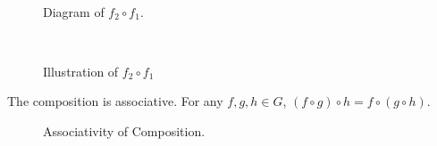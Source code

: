 \documentclass[11pt,openany]{article}
\begin{document}
\begin{note}[Diagram]
	\ \begin{figure}[h!]
		\centering
		
		\caption{Diagram of $f_2\circ f_1$.}
	\end{figure}
\end{note}
\newpage
\begin{note}[Illustration]
	\ \begin{figure}[h!]\centering
		\caption{Illustration of $f_2\circ f_1$}
	\end{figure}
\end{note}
\vfill
\begin{remark*}
	The composition is associative. For any \( f, g, h \in G \), $
	(f \circ g) \circ h = f \circ (g \circ h) $.
	\begin{figure}[h!]\centering
	\caption{Associativity of Composition.}
\end{figure}
\end{remark*}
\end{document}
